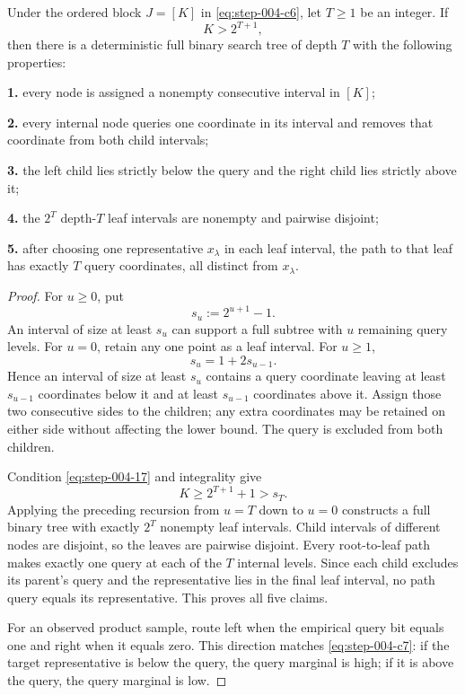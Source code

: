 \begin{lemma}
\label{lem:step-004-search-tree}

Under the ordered block \(J=[K]\) in \eqref{eq:step-004-c6}, let \(T\ge 1\) be an integer. If
\[
K>2^{T+1},
\tag{17}\label{eq:step-004-17}
\]
then there is a deterministic full binary search tree of depth \(T\) with the following properties:

\par\noindent\textbf{1.} every node is assigned a nonempty consecutive interval in \([K]\);
\par\noindent\textbf{2.} every internal node queries one coordinate in its interval and removes that coordinate from both child intervals;
\par\noindent\textbf{3.} the left child lies strictly below the query and the right child lies strictly above it;
\par\noindent\textbf{4.} the \(2^T\) depth-\(T\) leaf intervals are nonempty and pairwise disjoint;
\par\noindent\textbf{5.} after choosing one representative \(x_\lambda\) in each leaf interval, the path to that leaf has exactly \(T\) query coordinates, all distinct from \(x_\lambda\).

\end{lemma}

\begin{proof}

For \(u\ge 0\), put
\[
s_u:=2^{u+1}-1.
\tag{18}\label{eq:step-004-18}
\]
An interval of size at least \(s_u\) can support a full subtree with \(u\) remaining query levels. For \(u=0\), retain any one point as a leaf interval. For \(u\ge 1\),
\[
s_u=1+2s_{u-1}.
\tag{19}\label{eq:step-004-19}
\]
Hence an interval of size at least \(s_u\) contains a query coordinate leaving at least \(s_{u-1}\) coordinates below it and at least \(s_{u-1}\) coordinates above it. Assign those two consecutive sides to the children; any extra coordinates may be retained on either side without affecting the lower bound. The query is excluded from both children.

Condition \eqref{eq:step-004-17} and integrality give
\[
K\ge2^{T+1}+1>s_T.
\tag{20}\label{eq:step-004-20}
\]
Applying the preceding recursion from \(u=T\) down to \(u=0\) constructs a full binary tree with exactly \(2^T\) nonempty leaf intervals. Child intervals of different nodes are disjoint, so the leaves are pairwise disjoint. Every root-to-leaf path makes exactly one query at each of the \(T\) internal levels. Since each child excludes its parent's query and the representative lies in the final leaf interval, no path query equals its representative. This proves all five claims.

For an observed product sample, route left when the empirical query bit equals one and right when it equals zero. This direction matches \eqref{eq:step-004-c7}: if the target representative is below the query, the query marginal is high; if it is above the query, the query marginal is low.

\end{proof}


